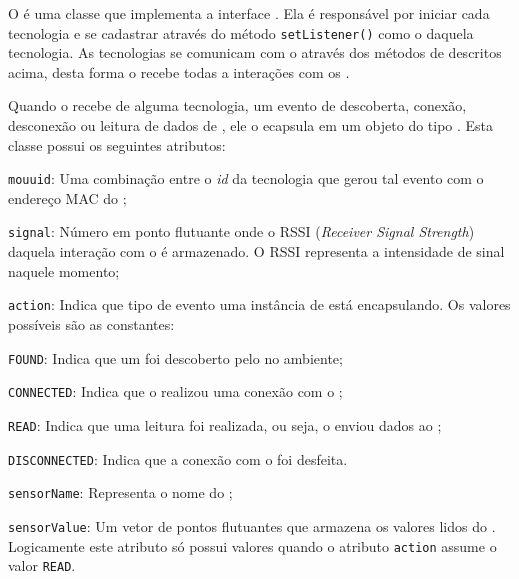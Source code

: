 O \stwopa é uma classe que implementa a interface \techlistener.
Ela é responsável por iniciar cada tecnologia e se cadastrar através do método \texttt{setListener()} como o \listener daquela tecnologia.
As tecnologias se comunicam com o \stwopa através dos métodos de \techlistener descritos acima, desta forma o \stwopa recebe todas a interações com os \smartobjs.

Quando o \stwopa recebe de alguma tecnologia, um evento de descoberta, conexão, desconexão ou leitura de dados de \smartobjs, ele o ecapsula em um objeto do tipo \sensordata.
Esta classe possui os seguintes atributos:

\begin{alineas}
	\item \texttt{mouuid}: Uma combinação entre o \textit{id} da tecnologia que gerou tal evento com o endereço MAC do \smartobj;

	\item \texttt{signal}: Número em ponto flutuante onde o RSSI (\textit{Receiver Signal Strength}) daquela interação com o \smartobj é armazenado. O RSSI representa a intensidade de sinal naquele momento;

	\item \texttt{action}: Indica que tipo de evento uma instância de \sensordata está encapsulando. Os valores possíveis são as constantes:

	\begin{alineas}

		\item \texttt{FOUND}: Indica que um \smartobj foi descoberto pelo \mhub no ambiente;

		\item \texttt{CONNECTED}: Indica que o \mhub realizou uma conexão com o \smartobj;

		\item \texttt{READ}: Indica que uma leitura foi realizada, ou seja, o \smartobj enviou dados ao \mhub;

		\item \texttt{DISCONNECTED}: Indica que a conexão com o \smartobj foi desfeita.

	\end{alineas}

	\item \texttt{sensorName}: Representa o nome do \smartobj;

	\item \texttt{sensorValue}: Um vetor de pontos flutuantes que armazena os valores lidos do \smartobj. Logicamente este atributo só possui valores quando o atributo \texttt{action} assume o valor \texttt{READ}.
\end{alineas}


